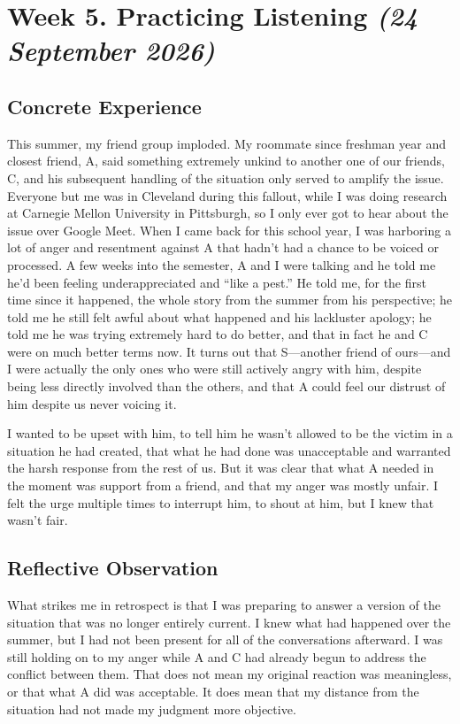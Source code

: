 \documentclass[12pt,stu,biblatex]{apa7}
\begin{document}
\section{Week 5. Practicing Listening \textit{(24 September 2026)}}

\subsection{Concrete Experience}
This summer, my friend group imploded.
My roommate since freshman year and closest friend, A, said something extremely unkind to another one of our friends, C, and his subsequent handling of the situation only served to amplify the issue.
Everyone but me was in Cleveland during this fallout, while I was doing research at Carnegie Mellon University in Pittsburgh, so I only ever got to hear about the issue over Google Meet.
When I came back for this school year, I was harboring a lot of anger and resentment against A that hadn't had a chance to be voiced or processed.
A few weeks into the semester, A and I were talking and he told me he'd been feeling underappreciated and ``like a pest.''
He told me, for the first time since it happened, the whole story from the summer from his perspective; he told me he still felt awful about what happened and his lackluster apology; he told me he was trying extremely hard to do better, and that in fact he and C were on much better terms now.
It turns out that S---another friend of ours---and I were actually the only ones who were still actively angry with him, despite being less directly involved than the others, and that A could feel our distrust of him despite us never voicing it.

I wanted to be upset with him, to tell him he wasn't allowed to be the victim in a situation he had created, that what he had done was unacceptable and warranted the harsh response from the rest of us.
But it was clear that what A needed in the moment was support from a friend, and that my anger was mostly unfair.
I felt the urge multiple times to interrupt him, to shout at him, but I knew that wasn't fair.

\subsection{Reflective Observation}
What strikes me in retrospect is that I was preparing to answer a version of the situation that was no longer entirely current.
I knew what had happened over the summer, but I had not been present for all of the conversations afterward.
I was still holding on to my anger while A and C had already begun to address the conflict between them.
That does not mean my original reaction was meaningless, or that what A did was acceptable.
It does mean that my distance from the situation had not made my judgment more objective.
\end{document}

